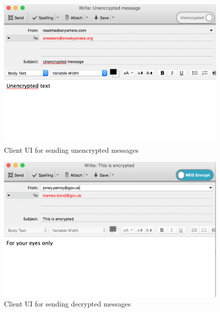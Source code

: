 \documentclass[10pt]{article}
\begin{document}
\begin{figure}[h]
    \centering
    \includegraphics[scale=.5]{unencrypted-client-ui.png}
    \caption{Client UI for sending unencrypted messages}
    \label{fig:unencrypted-ui}
\end{figure}
\begin{figure}[h]
    \centering
    \includegraphics[scale=.5]{encrypted-client-ui.png}
    \caption{Client UI for sending decrypted messages}
    \label{fig:encrypted-ui}
\end{figure}
\end{document}
